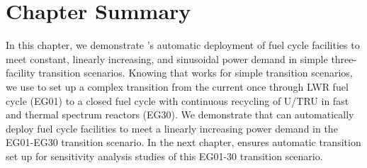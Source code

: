 \section{Chapter Summary}
In this chapter, we demonstrate \deploy's automatic deployment of 
fuel cycle facilities to meet constant, linearly increasing, 
and sinusoidal power demand in simple three-facility transition 
scenarios. 
Knowing that \deploy works for simple transition scenarios, 
we use \deploy to set up a complex transition from the current once through 
LWR fuel cycle (EG01) to a closed fuel cycle 
with continuous recycling of U/TRU in fast and thermal spectrum 
reactors (EG30).
We demonstrate that \deploy can automatically deploy fuel cycle facilities to 
meet a linearly increasing power demand in the EG01-EG30 
transition scenario. 
In the next chapter, \deploy ensures automatic transition set up for 
sensitivity analysis studies of this EG01-30 transition scenario. 

